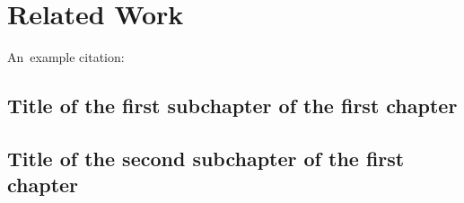 \chapter{Related Work}

An~example citation: \cite{Andel07}

\section{Title of the first subchapter of the first chapter}

\section{Title of the second subchapter of the first chapter}
